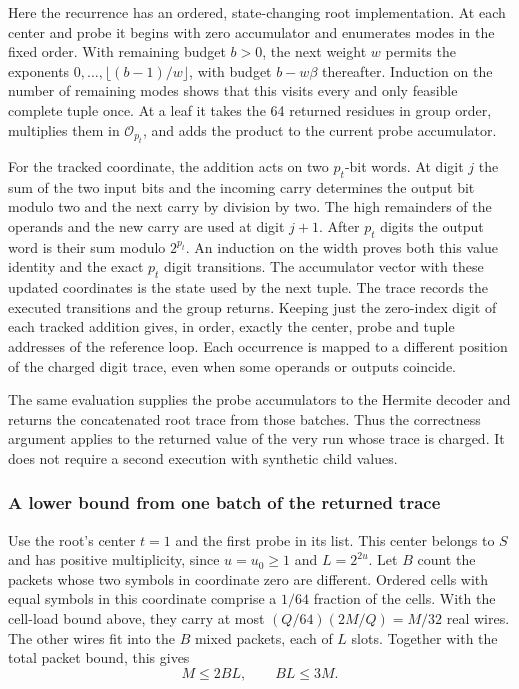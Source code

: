 \documentclass[
  11pt,
]{article}
\newcommand{\floor}[1]{\lfloor #1\rfloor}
\begin{document}
Here the recurrence has an ordered, state-changing root
implementation. At each center and probe it begins with zero
accumulator and enumerates modes in the fixed order. With
remaining budget \(b>0\), the next weight \(w\) permits the
exponents \(0,\ldots,\floor{(b-1)/w}\), with budget
\(b-w\beta\) thereafter. Induction on the number of remaining
modes shows that this visits every and only feasible complete
tuple once. At a leaf it takes the 64 returned residues in
group order, multiplies them in \(\mathcal O_{p_t}\), and adds
the product to the current probe accumulator.

For the tracked coordinate, the addition acts on two \(p_t\)-bit
words. At digit \(j\) the sum of the two input bits and the
incoming carry determines the output bit modulo two and the
next carry by division by two. The high remainders of the
operands and the new carry are used at digit \(j+1\).
After \(p_t\) digits the output word is their sum modulo \(2^{p_t}\).
An induction on the width proves both this value identity and
the exact \(p_t\) digit transitions. The accumulator vector
with these updated coordinates is the state used by the next
tuple. The trace records the executed transitions and the group
returns. Keeping just the zero-index digit of each tracked
addition gives, in order, exactly the center, probe and tuple
addresses of the reference loop. Each occurrence is mapped
to a different position of the charged digit trace, even when
some operands or outputs coincide.

The same evaluation supplies the probe accumulators to the
Hermite decoder and returns the concatenated root trace from
those batches. Thus the correctness argument applies to the
returned value of the very run whose trace is charged. It
does not require a second execution with synthetic child values.

\subsubsection*{A lower bound from one batch of the returned trace}

Use the root's center \(t=1\) and the first probe in its list.
This center belongs to \(S\) and has positive multiplicity, since
\(u=u_0\ge1\) and \(L=2^{2u}\).
Let \(B\) count the packets whose two symbols in coordinate
zero are different. Ordered cells with equal symbols in this
coordinate comprise a \(1/64\) fraction of the cells. With the
cell-load bound above, they carry at most
\((Q/64)(2M/Q)=M/32\) real wires. The other wires fit into
the \(B\) mixed packets, each of \(L\) slots. Together with the
total packet bound, this gives
\begin{equation}
                        M\le2BL,\qquad BL\le3M .
\label{eq:appendix-c-packet-load}
\end{equation}
\end{document}
